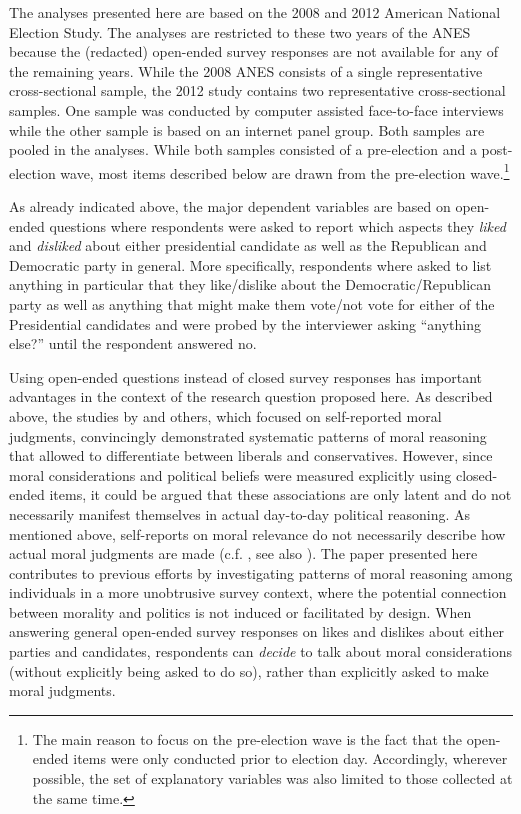 \documentclass[12pt]{article}
\begin{document}
The analyses presented here are based on the 2008 and 2012 American National Election Study. The analyses are restricted to these two years of the ANES because the (redacted) open-ended survey responses are not available for any of the remaining years. While the 2008 ANES consists of a single representative cross-sectional sample, the 2012 study contains two representative cross-sectional samples. One sample was conducted by computer assisted face-to-face interviews while the other sample is based on an internet panel group. Both samples are pooled in the analyses. While both samples consisted of a pre-election and a post-election wave, most items described below are drawn from the pre-election wave.\footnote{The main reason to focus on the pre-election wave is the fact that the open-ended items were only conducted prior to election day. Accordingly, wherever possible, the set of explanatory variables was also limited to those collected at the same time.}

As already indicated above, the major dependent variables are based on open-ended questions where respondents were asked to report which aspects they \textit{liked} and \textit{disliked} about either presidential candidate as well as the Republican and Democratic party in general. More specifically, respondents where asked to list anything in particular that they like/dislike about the Democratic/Republican party as well as anything that might make them vote/not vote for either of the Presidential candidates and were probed by the interviewer asking ``anything else?'' until the respondent answered no.

Using open-ended questions instead of closed survey responses has important advantages in the context of the research question proposed here. As described above, the studies by \citet{graham2009liberals} and others, which focused on self-reported moral judgments, convincingly demonstrated systematic patterns of moral reasoning that allowed to differentiate between liberals and conservatives. However, since moral considerations and political beliefs were measured explicitly using closed-ended items, it could be argued that these associations are only latent and do not necessarily manifest themselves in actual day-to-day political reasoning. As mentioned above, self-reports on moral relevance do not necessarily describe how actual moral judgments are made (c.f. \citealt[1031]{graham2009liberals}, see also \citealt{clifford2015moral}). The paper presented here contributes to previous efforts by investigating patterns of moral reasoning among individuals in a more unobtrusive survey context, where the potential connection between morality and politics is not induced or facilitated by design. When answering general open-ended survey responses on likes and dislikes about either parties and candidates, respondents can \textit{decide} to talk about moral considerations (without explicitly being asked to do so), rather than explicitly asked to make moral judgments.
\end{document}

